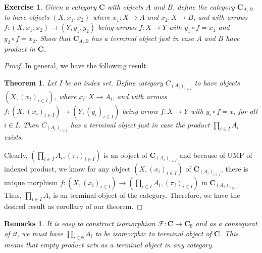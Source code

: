 \documentclass[a4paper, 11pt]{book}
\theoremstyle{plain}
\newtheorem{exercise}{Exercise}[chapter]
\newtheorem*{remarks}{Remarks}
\newtheorem*{theorem}{Theorem}
\theoremstyle{plain}
\newcommand{\mb}{\mathbf}
\newcommand{\arr}{\rightarrow}
\newcommand{\mc}{\mathcal}
\begin{document}
  \begin{exercise}
    Given a category $\mb{C}$ with objects $A$ and $B$, define the category $\mb{C}_{A,B}$ to have objects $(X, x_1,x_2)$ where $x_1:X \arr A$ and $x_2:X \arr B$, and with arrows $f:(X,x_1,x_2) \arr (Y, y_1, y_2)$ being arrows $f:X \arr Y$ with $y_1 \circ f=x_1$ and $y_2 \circ f=x_2$. Show that $\mb{C}_{A,B}$ has a terminal object just in case $A$ and $B$ have product in $\mb{C}$.
  \end{exercise}
  \begin{proof}
    In general, we have the following result. 
    \begin{theorem}
      Let $I$ be an index set. Define category $C_{(A_i)_{i \in I}}$ to have objects $(X, (x_i)_{i \in I})$, where $x_i:X \arr A_i$, and with arrows $f:(X, (x_i)_{i \in I}) \arr (Y, (y_i)_{i \in I})$ being arrow $f:X \arr Y$ with $y_i \circ f = x_i$ for all $i \in I$. Then $C_{(A_i)_{i \in I}}$ has a terminal object just in case the product $\prod_{i \in I} A_i$ exists.
    \end{theorem}
    Clearly, $(\prod_{i \in I} A_i, (\pi_i)_{i \in I})$ is an object of $\mb{C}_{(A_i)_{i \in I}}$ and because of UMP of indexed product, we know for any object $(X, (x_i)_{i \in I})$ of $\mb{C}_{(A_i)_{i \in I}}$, there is unique morphism $f:(X, (x_i)_{i \in I}) \arr (\prod_{i \in I} A_i, (\pi_i)_{i \in I})$ in $\mb{C}_{(A_i)_{i \in I}}$. Thus, $\prod_{i \in I} A_i$ is an terminal object of the category. Therefore, we have the desired result as corollary of our theorem.
  \end{proof}
  \begin{remarks}
    It is easy to construct isomorphism $\mc{F}:\mb{C} \arr \mb{C}_{\emptyset}$ and as a consequent of it, we must have $\prod_{i \in \emptyset} A_i$ to be isomorphic to terminal object of $\mb{C}$. This means that empty product acts as a terminal object in any category.
  \end{remarks}
\end{document}
